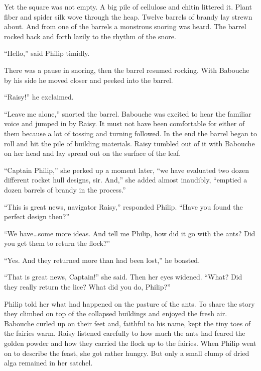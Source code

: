 \documentclass[10pt]{memoir}
\begin{document}
Yet the square was not empty. A big pile of cellulose and chitin littered it.
Plant fiber and spider silk wove through the heap. Twelve barrels of brandy lay
strewn about. And from one of the barrels a monstrous snoring was heard. The
barrel rocked back and forth lazily to the rhythm of the snore.

``Hello,'' said Philip timidly.

There was a pause in snoring, then the barrel resumed rocking. With Babouche by
his side he moved closer and peeked into the barrel.

``Raisy!'' he exclaimed.

``Leave me alone,'' snorted the barrel. Babouche was excited to hear the
familiar voice and jumped in by Raisy. It must not have been comfortable for
either of them because a lot of tossing and turning followed. In the end the
barrel began to roll and hit the pile of building materials. Raisy tumbled out
of it with Babouche on her head and lay spread out on the surface of the leaf.

``Captain Philip,'' she perked up a moment later, ``we have evaluated two dozen
different rocket hull designs, sir. And,'' she added almost inaudibly,
``emptied a dozen barrels of brandy in the process.''

``This is great news, navigator Raisy,'' responded Philip. ``Have you found the
perfect design then?''

``We have\dots some more ideas. And tell me Philip, how did it go with the
ants? Did you get them to return the flock?''

``Yes. And they returned more than had been lost,'' he boasted.

``That is great news, Captain!'' she said. Then her eyes widened. ``What? Did
they really return the lice? What did you do, Philip?''

Philip told her what had happened on the pasture of the ants. To share the
story they climbed on top of the collapsed buildings and enjoyed the fresh air.
Babouche curled up on their feet and, faithful to his name, kept the tiny toes
of the fairies warm. Raisy listened carefully to how much the ants had feared
the golden powder and how they carried the flock up to the fairies. When Philip
went on to describe the feast, she got rather hungry. But only a small clump of
dried alga remained in her satchel.
\end{document}
